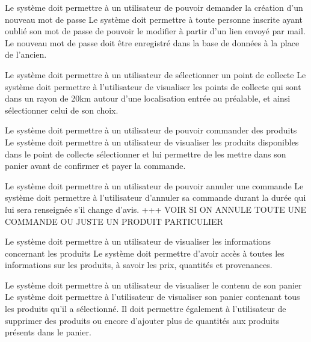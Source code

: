 \begin{reqs}{Le système doit permettre à un utilisateur de pouvoir demander la création d'un nouveau mot de passe}
Le système doit permettre à toute personne inscrite ayant oublié son mot de passe de pouvoir le modifier à partir d'un lien envoyé par mail. Le nouveau mot de passe doit être enregistré dans la base de données à la place de l'ancien.
\end{reqs}

\begin{reqs}{Le système doit permettre à un utilisateur de sélectionner un point de collecte}
Le système doit permettre à l'utilisateur de visualiser les points de collecte qui sont dans un rayon de 20km autour d'une localisation entrée au préalable, et ainsi sélectionner celui de son choix.
\end{reqs}

\begin{reqs}{Le système doit permettre à un utilisateur de pouvoir commander des produits}
Le système doit permettre à un utilisateur de visualiser les produits disponibles dans le point de collecte sélectionner et lui permettre de les mettre dans son panier avant de confirmer et payer la commande.
\end{reqs}

\begin{reqs}{Le système doit permettre à un utilisateur de pouvoir annuler une commande}
Le système doit permettre à l'utilisateur d'annuler sa commande durant la durée qui lui sera renseignée s'il change d'avis. +++ VOIR SI ON ANNULE TOUTE UNE COMMANDE OU JUSTE UN PRODUIT PARTICULIER
\end{reqs}

\begin{reqs}{Le système doit permettre à un utilisateur de visualiser les informations concernant les produits}
Le système doit permettre d'avoir accès à toutes les informations sur les produits, à savoir les prix, quantités et provenances.
\end{reqs}

\begin{reqs}{Le système doit permettre à un utilisateur de visualiser le contenu de son panier}
Le système doit permettre à l'utilisateur de visualiser son panier contenant tous les produits qu'il a sélectionné. Il doit permettre également à l'utilisateur de supprimer des produits ou encore d'ajouter plus de quantités aux produits présents dans le panier.
\end{reqs}

